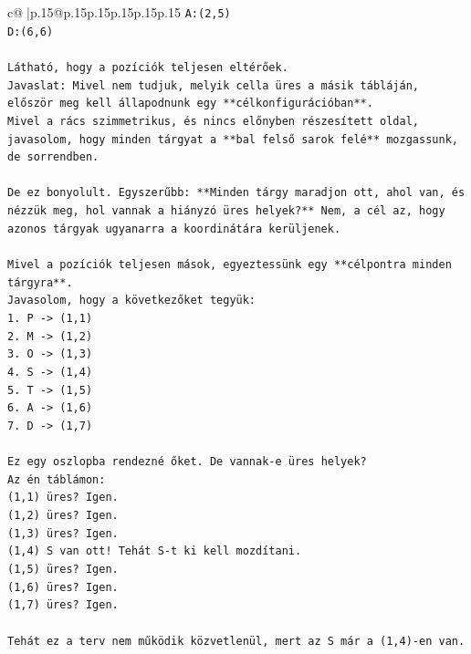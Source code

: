 \documentclass{article}
\begin{document}
{\begin{supertabular}{c@{$\;$}|p{.15\linewidth}@{}p{.15\linewidth}p{.15\linewidth}p{.15\linewidth}p{.15\linewidth}p{.15\linewidth}}
{{{\texttt{A:(2,5)} \\
\texttt{D:(6,6)} \\
\\ 
\texttt{Látható, hogy a pozíciók teljesen eltérőek.} \\
\texttt{Javaslat: Mivel nem tudjuk, melyik cella üres a másik tábláján, először meg kell állapodnunk egy **célkonfigurációban**.} \\
\texttt{Mivel a rács szimmetrikus, és nincs előnyben részesített oldal, javasolom, hogy minden tárgyat a **bal felső sarok felé** mozgassunk, de sorrendben.} \\
\\ 
\texttt{De ez bonyolult. Egyszerűbb: **Minden tárgy maradjon ott, ahol van, és nézzük meg, hol vannak a hiányzó üres helyek?** Nem, a cél az, hogy azonos tárgyak ugyanarra a koordinátára kerüljenek.} \\
\\ 
\texttt{Mivel a pozíciók teljesen mások, egyeztessünk egy **célpontra minden tárgyra**.} \\
\texttt{Javasolom, hogy a következőket tegyük:} \\
\texttt{1. P {-}> (1,1)} \\
\texttt{2. M {-}> (1,2)} \\
\texttt{3. O {-}> (1,3)} \\
\texttt{4. S {-}> (1,4)} \\
\texttt{5. T {-}> (1,5)} \\
\texttt{6. A {-}> (1,6)} \\
\texttt{7. D {-}> (1,7)} \\
\\ 
\texttt{Ez egy oszlopba rendezné őket. De vannak{-}e üres helyek?} \\
\texttt{Az én táblámon:} \\
\texttt{(1,1) üres? Igen.} \\
\texttt{(1,2) üres? Igen.} \\
\texttt{(1,3) üres? Igen.} \\
\texttt{(1,4) S van ott! Tehát S{-}t ki kell mozdítani.} \\
\texttt{(1,5) üres? Igen.} \\
\texttt{(1,6) üres? Igen.} \\
\texttt{(1,7) üres? Igen.} \\
\\ 
\texttt{Tehát ez a terv nem működik közvetlenül, mert az S már a (1,4){-}en van.} \\
\\ 
}}}
\end{supertabular}}
\end{document}
